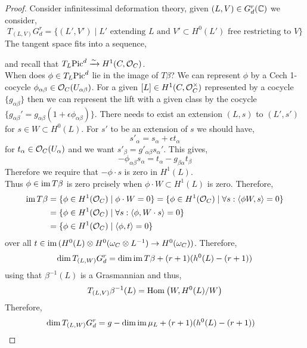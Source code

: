 \documentclass[12pt]{article}
\begin{document}
\begin{proof}
Consider infinitessimal deformation theory, given $(L, V) \in G^r_d(\mathbb{C})$ we consider,
\[ T_{(L, V)} G^r_d = \{ (L', V') \mid L' \text{ extending } L \text{ and } V' \subset H^0(L') \text{ free restricting to } V \} \]
The tangent space fits into a sequence,
\begin{center}
\end{center}
and recall that $T_{L} \mathrm{Pic}^d \xrightarrow{\sim} H^1(C, \mathcal{O}_{C})$.
\bigskip\\
When does $\phi \in T_L \mathrm{Pic}^d$ lie in the image of $T \beta$? We can represent $\phi$ by a Cech 1-cocycle $\phi_{\alpha \beta} \in \mathcal{O}_{C}(U_{\alpha \beta})$. For a given $[L] \in H^1(C, \mathcal{O}_{C}^\times)$ represented by a cocycle $\{ g_{\alpha \beta} \}$ then we can represent the lift with a given class by the cocycle $\{ g_{\alpha \beta}' = g_{\alpha \beta} (1 + \epsilon \phi_{\alpha \beta}) \}$. There needs to exist an extension $(L, s)$ to $(L', s')$ for $s \in W \subset H^0(L)$. For $s'$ to be an extension of $s$ we should have,
\[ s'_\alpha = s_\alpha + \epsilon t_\alpha \]
for $t_\alpha \in \mathcal{O}_{C}(U_\alpha)$ and we want $s'_\beta = g'_{\alpha \beta} s_\alpha'$. This gives,
\[ - \phi_{\alpha \beta} s_\alpha = t_\alpha - g_{\beta \alpha} t_\beta \]
Therefore we require that $- \phi \cdot s$ is zero in $H^1(L)$. 
\bigskip\\
Thus $\phi \in \operatorname{\mathrm{im}}{T \beta}$ is zero prcisely when $\phi \cdot W \subset H^1(L)$ is zero. Therefore,
\begin{align*}
\operatorname{\mathrm{im}}{T \beta} & = \{ \phi \in H^1(\mathcal{O}_{C}) \mid \phi \cdot W = 0 \} = \{ \phi \in H^1(\mathcal{O}_{C}) \mid \forall s : \left< \phi W, s \right> = 0 \}
\\
& = \{ \phi \in H^1(\mathcal{O}_{C}) \mid \forall s : \left< \phi, W \cdot s \right> = 0 \} 
\\
& = \{ \phi \in H^1(\mathcal{O}_{C}) \mid \left< \phi, t \right> = 0 \} 
\end{align*}
over all $t \in \operatorname{\mathrm{im}}{(H^0(L) \otimes H^0(\omega_C \otimes L^{-1}) \to H^0(\omega_C))}$. Therefore,
\[ \dim{T_{(L, W)} G^r_d} = \dim{\operatorname{\mathrm{im}}{T \beta}} + (r+1) (h^0(L) - (r+1)) \]
using that $\beta^{-1}(L)$ is a Grasmannian and thus,
\[ T_{(L, V)} \beta^{-1}(L) = \mathrm{Hom}_{} \left( W, H^0(L)/W \right) \]
Therefore,
\begin{align*}
\dim{T_{(L, W)} G^r_d} & = g - \dim{\im{\mu_L}} + (r + 1) (h^0(L) - (r+1))

\end{align*}
\end{proof}
\end{document}
